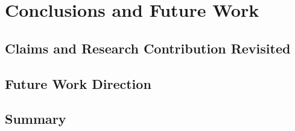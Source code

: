 \chapter{Conclusions and Future Work}
\section{Claims and Research Contribution Revisited}

\section{Future Work Direction}

\section{Summary}


